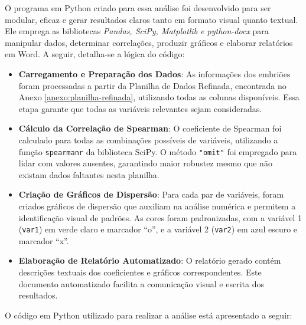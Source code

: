 O programa em Python criado para essa análise foi desenvolvido para ser modular, eficaz e gerar resultados claros tanto em formato visual quanto textual. Ele emprega as bibliotecas \textit{Pandas, SciPy, Matplotlib e python-docx} para manipular dados, determinar correlações, produzir gráficos e elaborar relatórios em Word. A seguir, detalha-se a lógica do código:

\begin{itemize}
    \item \textbf{Carregamento e Preparação dos Dados}: As informações dos embriões foram processadas a partir da Planilha de Dados Refinada, encontrada no Anexo \ref{anexo:planilha-refinada}, utilizando todas as colunas disponíveis. Essa etapa garante que todas as variáveis relevantes sejam consideradas.
    \item \textbf{Cálculo da Correlação de Spearman}: O coeficiente de Spearman foi calculado para todas as combinações possíveis de variáveis, utilizando a função \texttt{spearmanr} da biblioteca SciPy. O método \texttt{"omit"} foi empregado para lidar com valores ausentes, garantindo maior robustez mesmo que não existam dados faltantes nesta planilha.
    \item \textbf{Criação de Gráficos de Dispersão}: Para cada par de variáveis, foram criados gráficos de dispersão que auxiliam na análise numérica e permitem a identificação visual de padrões. As cores foram padronizadas, com a variável 1 (\texttt{var1}) em verde claro e marcador ``o'', e a variável 2 (\texttt{var2}) em azul escuro e marcador ``x''.
    \item \textbf{Elaboração de Relatório Automatizado}: O relatório gerado contém descrições textuais dos coeficientes e gráficos correspondentes. Este documento automatizado facilita a comunicação visual e escrita dos resultados.
\end{itemize}

O código em Python utilizado para realizar a análise está apresentado a seguir:

